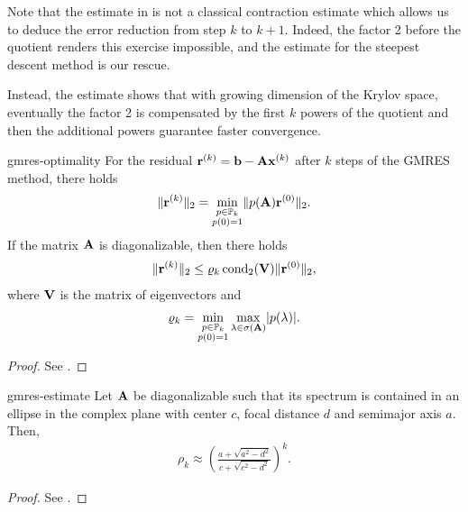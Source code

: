 \begin{remark}
  Note that the estimate in 
  is not a classical contraction estimate which allows us to deduce
  the error reduction from step $k$ to $k+1$. Indeed, the factor 2
  before the quotient renders this exercise impossible, and the
  estimate for the steepest descent method is our rescue.

  Instead, the estimate shows that with growing dimension of the
  Krylov space, eventually the factor 2 is compensated by the first
  $k$ powers of the quotient and then the additional powers guarantee
  faster convergence.
\end{remark}


\begin{Theorem}{gmres-optimality}
  For the residual $\mathbf r^{(k)} = \mathbf b-\mathbf A\mathbf x^{(k)}$ after $k$ steps of
  the GMRES method, there holds
  \begin{gather}
    \lVert\mathbf r^{(k)}\rVert_2 = \min_{\substack{p\in\mathbb P_k\\p(0) = 1}}
    \lVert p(\mathbf A)\mathbf r^{(0)}\rVert_2.
  \end{gather}
  If the matrix $\mathbf A$ is diagonalizable, then there holds
    \begin{gather}
    \lVert\mathbf r^{(k)}\rVert_2 \le \varrho_k \operatorname{cond}_2(\mathbf V) \lVert\mathbf r^{(0)}\rVert_2,
  \end{gather}
  where $\mathbf V$ is the matrix of eigenvectors and
  \begin{gather}
    \varrho_k = \min_{\substack{p\in\mathbb P_k\\p(0) = 1}} \max_{\lambda\in\sigma(\mathbf A)} \lvert p(\lambda)\rvert.
  \end{gather}
\end{Theorem}

\begin{proof}
  See \cite[Proposition 6.32]{Saad00}.
\end{proof}

\begin{Corollary}{gmres-estimate}
  Let $\mathbf A$ be diagonalizable such that its spectrum is contained in
  an ellipse in the complex plane with center $c$, focal distance $d$
  and semimajor axis $a$. Then,
  \begin{gather}
     \rho_k \approx \left(
      \frac{a+\sqrt{a^2-d^2}}{c+\sqrt{c^2-d^2}}
      \right)^k.
  \end{gather}
\end{Corollary}

\begin{proof}
  See \cite[Corollary 6.33]{Saad00}.
\end{proof}

